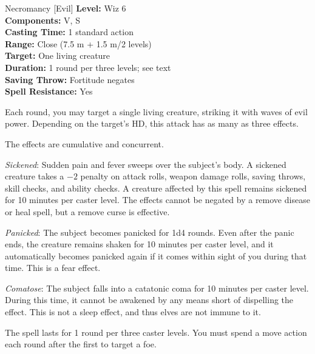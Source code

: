 {Necromancy [Evil]}
{
	\textbf{Level:}
	Wiz 6\\
	\textbf{Components:}
	V, S\\
	\textbf{Casting Time:}
	1 standard action\\
	\textbf{Range:}
	Close (7.5 m + 1.5 m/2 levels)\\
	\textbf{Target:}
	One living creature\\
	\textbf{Duration:}
	1 round per three levels; see text\\
	\textbf{Saving Throw:}
	Fortitude negates\\
	\textbf{Spell Resistance:}
	Yes\\
}
{
	Each round, you may target a single living creature, striking it with waves of evil power. Depending on the target's HD, this attack has as many as three effects.


	The effects are cumulative and concurrent.

	\textit{Sickened}:
	Sudden pain and fever sweeps over the subject's body. A sickened creature takes a $-2$ penalty on attack rolls, weapon damage rolls, saving throws, skill checks, and ability checks. A creature affected by this spell remains sickened for 10 minutes per caster level. The effects cannot be negated by a remove disease or heal spell, but a remove curse is effective.

	\textit{Panicked}:
	The subject becomes panicked for 1d4 rounds. Even after the panic ends, the creature remains shaken for 10 minutes per caster level, and it automatically becomes panicked again if it comes within sight of you during that time. This is a fear effect.

	\textit{Comatose}:
	The subject falls into a catatonic coma for 10 minutes per caster level. During this time, it cannot be awakened by any means short of dispelling the effect. This is not a sleep effect, and thus elves are not immune to it.

	The spell lasts for 1 round per three caster levels. You must spend a move action each round after the first to target a foe.

}
